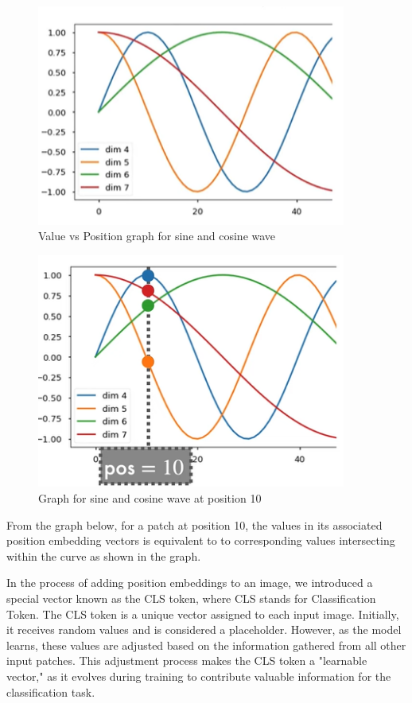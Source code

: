 \begin{figure}[htbp]
    \centering
    \includegraphics[width=4in]{img/plot for sine and cosine wave.png}
    \caption{{Value vs Position graph for sine and cosine wave}}
\end{figure}
\begin{figure}[htbp]
    \centering
    \includegraphics[width=4in]{img/pos 10.png}
    \caption{{Graph for sine and cosine wave  at position 10}}
\end{figure}
\noindent From the graph below, for a patch at position 10, the values in its associated position embedding vectors is equivalent to to corresponding values intersecting within the curve as shown in the graph.

\noindent In the process of adding position embeddings to an image, we introduced a special vector known as the CLS token, where CLS stands for Classification Token. The CLS token is a unique vector assigned to each input image. Initially, it receives random values and is considered a placeholder. However, as the model learns, these values are adjusted based on the information gathered from all other input patches. This adjustment process makes the CLS token a "learnable vector," as it evolves during training to contribute valuable information for the classification task.\\

